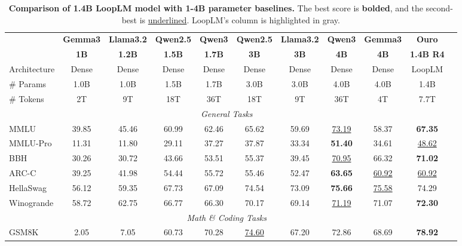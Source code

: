 \documentclass[]{bytedance_seed}
\newcommand{\1}{\mathbf{1}}
\newcommand{\ut}{LoopLM}
\begin{document}
\begin{table}[htbp]
\centering
\caption{\textbf{Comparison of 1.4B  \ut{} model with 1-4B parameter baselines.} The best score is \textbf{bolded}, and the second-best is \underline{underlined}. \ut{}'s column is highlighted in gray.}
\label{tab:base-1.4B}
\small
\setlength{\tabcolsep}{2.5pt}
\begin{tabular}{@{}lcccccccccc@{}}
\toprule
 & \textbf{Gemma3} & \textbf{Llama3.2} & \textbf{Qwen2.5} & \textbf{Qwen3} & \textbf{Qwen2.5} & \textbf{Llama3.2} & \textbf{Qwen3} & \textbf{Gemma3} & \cellcolor{lightergray}\textbf{Ouro} \\
 & \textbf{1B} & \textbf{1.2B} & \textbf{1.5B} & \textbf{1.7B} & \textbf{3B} & \textbf{3B} & \textbf{4B} & \textbf{4B} & \cellcolor{lightergray}\textbf{1.4B R4} \\
\midrule
Architecture & Dense & Dense & Dense & Dense & Dense & Dense & Dense & Dense & \cellcolor{lightergray}\ut{}\\
\# Params & 1.0B & 1.0B & 1.5B & 1.7B & 3.0B & 3.0B & 4.0B & 4.0B & \cellcolor{lightergray}1.4B\\
\# Tokens & 2T & 9T & 18T & 36T & 18T & 9T & 36T & 4T & \cellcolor{lightergray}7.7T\\
\midrule
\multicolumn{10}{c}{\textit{General Tasks}} \\
\midrule
MMLU & 39.85 & 45.46 & 60.99 & 62.46 & 65.62 & 59.69 & \underline{73.19} & 58.37 & \cellcolor{lightergray}\textbf{67.35} \\
MMLU-Pro & 11.31 & 11.80 & 29.11 & 37.27 & 37.87 & 33.34 & \textbf{51.40} & 34.61 & \cellcolor{lightergray}\underline{48.62} \\
BBH & 30.26 & 30.72 & 43.66 & 53.51 & 55.37 & 39.45 & \underline{70.95} & 66.32 & \cellcolor{lightergray}\textbf{71.02} \\
ARC-C & 39.25 & 41.98 & 54.44 & 55.72 & 55.46 & 52.47 & \textbf{63.65} & \underline{60.92} & \cellcolor{lightergray}\underline{60.92} \\
HellaSwag & 56.12 & 59.35 & 67.73 & 67.09 & 74.54 & 73.09 & \textbf{75.66} & \underline{75.58} & \cellcolor{lightergray}74.29 \\
Winogrande & 58.72 & 62.75 & 66.77 & 66.30 & 70.17 & 69.14 & \underline{71.19} & 71.07 & \cellcolor{lightergray}\textbf{72.30} \\
\midrule
\multicolumn{10}{c}{\textit{Math \& Coding Tasks}} \\
\midrule
GSM8K & 2.05 & 7.05 & 60.73 & 70.28 & \underline{74.60} & 67.20 & 72.86 & 68.69 & \cellcolor{lightergray}\textbf{78.92} \\

\end{tabular}
\end{table}
\end{document}
